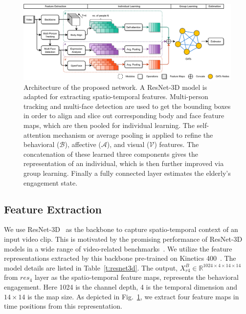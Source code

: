 \documentclass[VANCOUVER,STIX1COL]{WileyNJD-v2}
\begin{document}
\begin{figure}[ht!]
  \centering
  \includegraphics[width=0.96\linewidth]{assets/pipeline_4.drawio}
  \caption{Architecture of the proposed network. A ResNet-3D model is adapted for extracting spatio-temporal features. Multi-person tracking and multi-face detection are used to get the bounding boxes in order to align and slice out corresponding body and face feature maps, which are then pooled for individual learning. The self-attention mechanism or average pooling is applied to refine the behavioral ($\mathcal{B}$), affective ($\mathcal{A}$), and visual ($\mathcal{V}$) features. The concatenation of these learned three components gives the  representation of an individual, which is then further improved via group learning. Finally a fully connected layer estimates the elderly's engagement state.}
  \label{f:pipeline_4}
\end{figure}


\subsection{Feature Extraction}
\label{subs:Feature_Extraction}

We use ResNet-3D~\cite{Hara2018Can} as the backbone to capture spatio-temporal context of an input video clip. This is motivated by the promising performance of ResNet-3D models in a wide range of video-related benchmarks~\cite{Chen2021Deep}. We utilize the feature representations extracted by this backbone pre-trained on Kinetics 400~\cite{Kay2017Kinetics}. The model details are listed in Table~\ref{t:resnet3d}. The output, $X^B_{r4} \in \mathbb{R}^{1024\times4\times14\times14}$ from $res_4$ layer as the spatio-temporal feature maps, represents the behavioral engagement. Here 1024 is the channel depth, 4 is the temporal dimension and $14\times14$ is the map size. As depicted in Fig.~\ref{f:pipeline_4}, we extract four feature maps in time positions from this representation.
\end{document}
